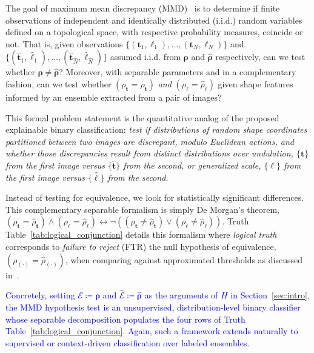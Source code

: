 \documentclass[pdflatex,iicol]{sn-jnl}%
\theoremstyle{thmstyleone}%
\theoremstyle{thmstyletwo}%
\theoremstyle{thmstylethree}%
\begin{document}
The goal of maximum mean discrepancy (MMD)~\cite{fortet1953convergence,gretton2012kernel} is to determine if finite observations of independent and identically distributed (i.i.d.) random variables defined on a topological space, with respective probability measures, coincide or not. That is, given observations $\lbrace (\boldsymbol{t}_1, \boldsymbol{\ell}_1),\dots,(\boldsymbol{t}_N, \boldsymbol{\ell}_N)\rbrace$ and $\lbrace (\widehat{\boldsymbol{t}}_1, \widehat{\boldsymbol{\ell}}_1),\dots,(\widehat{\boldsymbol{t}}_{\widehat{N}}, \widehat{\boldsymbol{\ell}}_{\widehat{N}}) \rbrace$ assumed i.i.d. from $\boldsymbol{\rho}$ and $\widehat{\boldsymbol{\rho}}$ respectively, can we test whether $\boldsymbol{\rho} \neq \widehat{\boldsymbol{\rho}}$? Moreover, with separable parameters and in a complementary fashion, can we test whether $(\rho_{\boldsymbol{t}} = \widehat{\rho}_{\boldsymbol{t}})$ \emph{and} $(\rho_{\boldsymbol{\ell}} = \widehat{\rho}_{\boldsymbol{\ell}})$ given shape features informed by an ensemble extracted from a pair of images? 

This formal problem statement is the quantitative analog of the proposed explainable binary classification: \textit{test if distributions of random shape coordinates partitioned between two images are discrepant, modulo Euclidean actions, and whether those discrepancies result from distinct distributions over undulation, $\lbrace \boldsymbol{t} \rbrace$ from the first image versus $\lbrace \widehat{\boldsymbol{t}} \rbrace$ from the second, \emph{or} generalized scale, $\lbrace \boldsymbol{\ell} \rbrace$ from the first image versus $\lbrace \widehat{\boldsymbol{\ell}} \rbrace$ from the second.}

Instead of testing for equivalence, we look for statistically significant differences. This complementary separable formalism is simply De Morgan's theorem, $(\rho_{\boldsymbol{t}} = \widehat{\rho}_{\boldsymbol{t}})\wedge (\rho_{\boldsymbol{\ell}} = \widehat{\rho}_{\boldsymbol{\ell}}) \leftrightarrow \neg ((\rho_{\boldsymbol{t}} \neq \widehat{\rho}_{\boldsymbol{t}}) \vee (\rho_{\boldsymbol{\ell}} \neq \widehat{\rho}_{\boldsymbol{\ell}}))$. Truth Table~\ref{tab:logical_conjunction} details this formalism where \textit{logical truth} corresponds to \textit{failure to reject} (FTR) the null hypothesis of equivalence, $(\rho_{(\cdot)} = \widehat{\rho}_{(\cdot)})$, when comparing against approximated thresholds as discussed in~\cite{gretton2012kernel}.

\textcolor{blue}{Concretely, setting $\mathcal{E}\coloneqq\boldsymbol{\rho}$ and $\widehat{\mathcal{E}}\coloneqq\widehat{\boldsymbol{\rho}}$ as the arguments of $H$ in Section~\ref{sec:intro}, the MMD hypothesis test is an unsupervised, distribution-level binary classifier whose separable decomposition populates the four rows of Truth Table~\ref{tab:logical_conjunction}. Again, such a framework extends naturally to supervised or context-driven classification over labeled ensembles.}
\end{document}
